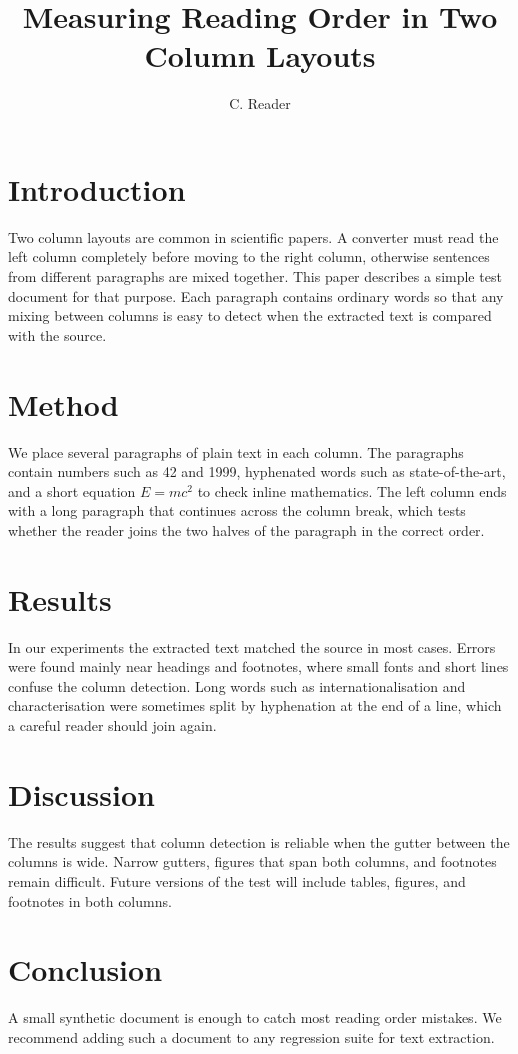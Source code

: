 \documentclass[twocolumn,10pt]{article}
\title{Measuring Reading Order in Two Column Layouts}
\author{C. Reader}
\date{}
\begin{document}
\maketitle
\section{Introduction}
Two column layouts are common in scientific papers. A converter must read the left column completely
before moving to the right column, otherwise sentences from different paragraphs are mixed together.
This paper describes a simple test document for that purpose. Each paragraph contains ordinary words so that
any mixing between columns is easy to detect when the extracted text is compared with the source.
\section{Method}
We place several paragraphs of plain text in each column. The paragraphs contain numbers such as 42 and 1999,
hyphenated words such as state-of-the-art, and a short equation $E = mc^2$ to check inline mathematics.
The left column ends with a long paragraph that continues across the column break, which tests whether the
reader joins the two halves of the paragraph in the correct order.
\section{Results}
In our experiments the extracted text matched the source in most cases. Errors were found mainly near
headings and footnotes, where small fonts and short lines confuse the column detection.
Long words such as internationalisation and characterisation were sometimes split by hyphenation at
the end of a line, which a careful reader should join again.
\section{Discussion}
The results suggest that column detection is reliable when the gutter between the columns is wide.
Narrow gutters, figures that span both columns, and footnotes remain difficult. Future versions of the test
will include tables, figures, and footnotes in both columns.
\section{Conclusion}
A small synthetic document is enough to catch most reading order mistakes. We recommend adding such a document
to any regression suite for text extraction.
\end{document}
